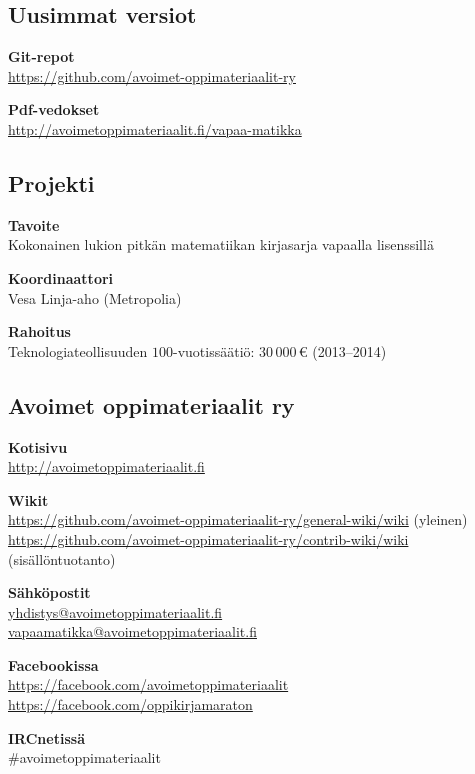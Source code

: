 \subsection*{Uusimmat versiot}

\textbf{Git-repot} \\
\url{https://github.com/avoimet-oppimateriaalit-ry}

\textbf{Pdf-vedokset} \\
\url{http://avoimetoppimateriaalit.fi/vapaa-matikka}

\subsection*{Projekti}

\textbf{Tavoite} \\
Kokonainen lukion pitkän matematiikan kirjasarja vapaalla lisenssillä

\textbf{Koordinaattori} \\
Vesa Linja-aho (Metropolia)

\textbf{Rahoitus} \\
Teknologiateollisuuden $100$-vuotissäätiö: $30\,000$\,\euro \; (2013--2014)

\subsection*{Avoimet oppimateriaalit ry}

\textbf{Kotisivu} \\
\url{http://avoimetoppimateriaalit.fi}

\textbf{Wikit} \\
\url{https://github.com/avoimet-oppimateriaalit-ry/general-wiki/wiki} (yleinen) \\
\url{https://github.com/avoimet-oppimateriaalit-ry/contrib-wiki/wiki} (sisällöntuotanto)

\textbf{Sähköpostit} \\
\href{mailto:yhdistys@avoimetoppimateriaalit.fi}{yhdistys@avoimetoppimateriaalit.fi} \\
\href{mailto:vapaamatikka@avoimetoppimateriaalit.fi}{vapaamatikka@avoimetoppimateriaalit.fi}

\textbf{Facebookissa} \\
\url{https://facebook.com/avoimetoppimateriaalit} \\
\url{https://facebook.com/oppikirjamaraton}

\textbf{IRCnetissä} \\
\#avoimetoppimateriaalit
